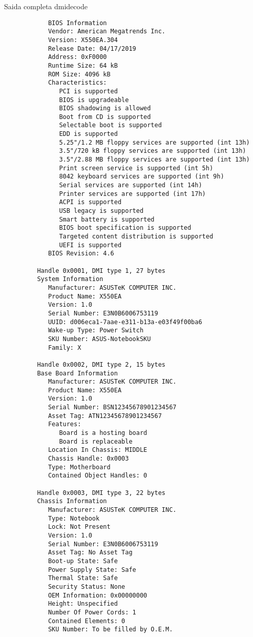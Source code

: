 \documentclass[11pt]{article}
\begin{document}
      \newpage
      Saida completa dmidecode\\
      \begin{tiny}
         \begin{verbatim}
            BIOS Information
            Vendor: American Megatrends Inc.
            Version: X550EA.304
            Release Date: 04/17/2019
            Address: 0xF0000
            Runtime Size: 64 kB
            ROM Size: 4096 kB
            Characteristics:
               PCI is supported
               BIOS is upgradeable
               BIOS shadowing is allowed
               Boot from CD is supported
               Selectable boot is supported
               EDD is supported
               5.25"/1.2 MB floppy services are supported (int 13h)
               3.5"/720 kB floppy services are supported (int 13h)
               3.5"/2.88 MB floppy services are supported (int 13h)
               Print screen service is supported (int 5h)
               8042 keyboard services are supported (int 9h)
               Serial services are supported (int 14h)
               Printer services are supported (int 17h)
               ACPI is supported
               USB legacy is supported
               Smart battery is supported
               BIOS boot specification is supported
               Targeted content distribution is supported
               UEFI is supported
            BIOS Revision: 4.6
         
         Handle 0x0001, DMI type 1, 27 bytes
         System Information
            Manufacturer: ASUSTeK COMPUTER INC.
            Product Name: X550EA
            Version: 1.0       
            Serial Number: E3N0B6006753119     
            UUID: d006eca1-7aae-e311-b13a-e03f49f00ba6
            Wake-up Type: Power Switch
            SKU Number: ASUS-NotebookSKU
            Family: X
         
         Handle 0x0002, DMI type 2, 15 bytes
         Base Board Information
            Manufacturer: ASUSTeK COMPUTER INC.
            Product Name: X550EA
            Version: 1.0       
            Serial Number: BSN12345678901234567
            Asset Tag: ATN12345678901234567
            Features:
               Board is a hosting board
               Board is replaceable
            Location In Chassis: MIDDLE              
            Chassis Handle: 0x0003
            Type: Motherboard
            Contained Object Handles: 0
         
         Handle 0x0003, DMI type 3, 22 bytes
         Chassis Information
            Manufacturer: ASUSTeK COMPUTER INC.
            Type: Notebook
            Lock: Not Present
            Version: 1.0       
            Serial Number: E3N0B6006753119     
            Asset Tag: No Asset Tag
            Boot-up State: Safe
            Power Supply State: Safe
            Thermal State: Safe
            Security Status: None
            OEM Information: 0x00000000
            Height: Unspecified
            Number Of Power Cords: 1
            Contained Elements: 0
            SKU Number: To be filled by O.E.M.
         

\end{verbatim}
\end{tiny}
\end{document}
